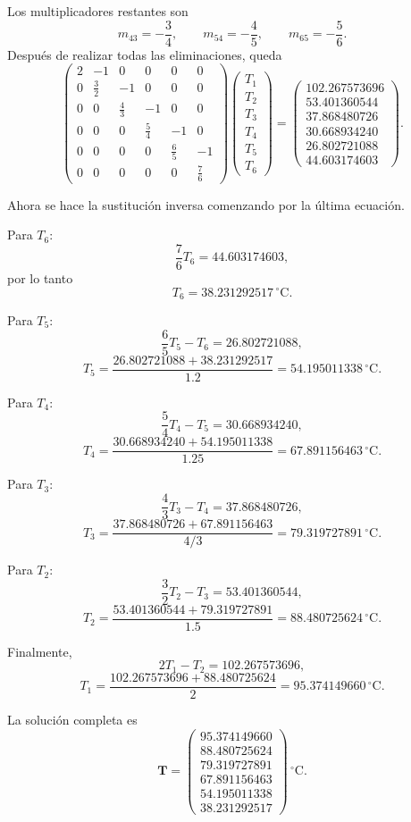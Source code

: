 \documentclass[11pt,a4paper]{article}
\begin{document}
Los multiplicadores restantes son
\[
m_{43}=-\frac34,\qquad
m_{54}=-\frac45,\qquad
m_{65}=-\frac56.
\]
Después de realizar todas las eliminaciones, queda
\begin{equation}
\begin{pmatrix}
2&-1&0&0&0&0\\
0&\frac32&-1&0&0&0\\
0&0&\frac43&-1&0&0\\
0&0&0&\frac54&-1&0\\
0&0&0&0&\frac65&-1\\
0&0&0&0&0&\frac76
\end{pmatrix}
\begin{pmatrix}T_1\\T_2\\T_3\\T_4\\T_5\\T_6\end{pmatrix}
=
\begin{pmatrix}
102.267573696\\
53.401360544\\
37.868480726\\
30.668934240\\
26.802721088\\
44.603174603
\end{pmatrix}.
\end{equation}

Ahora se hace la sustitución inversa comenzando por la última ecuación.

Para $T_6$:
\[
\frac76T_6=44.603174603,
\]
por lo tanto
\[
T_6=38.231292517\,^{\circ}\mathrm C.
\]

Para $T_5$:
\[
\frac65T_5-T_6=26.802721088,
\]
\[
T_5=\frac{26.802721088+38.231292517}{1.2}
=54.195011338\,^{\circ}\mathrm C.
\]

Para $T_4$:
\[
\frac54T_4-T_5=30.668934240,
\]
\[
T_4=\frac{30.668934240+54.195011338}{1.25}
=67.891156463\,^{\circ}\mathrm C.
\]

Para $T_3$:
\[
\frac43T_3-T_4=37.868480726,
\]
\[
T_3=\frac{37.868480726+67.891156463}{4/3}
=79.319727891\,^{\circ}\mathrm C.
\]

Para $T_2$:
\[
\frac32T_2-T_3=53.401360544,
\]
\[
T_2=\frac{53.401360544+79.319727891}{1.5}
=88.480725624\,^{\circ}\mathrm C.
\]

Finalmente,
\[
2T_1-T_2=102.267573696,
\]
\[
T_1=\frac{102.267573696+88.480725624}{2}
=95.374149660\,^{\circ}\mathrm C.
\]

La solución completa es
\begin{equation}
\boxed{
\mathbf T=
\begin{pmatrix}
95.374149660\\
88.480725624\\
79.319727891\\
67.891156463\\
54.195011338\\
38.231292517
\end{pmatrix}\,^{\circ}\mathrm C.}
\end{equation}
\end{document}
